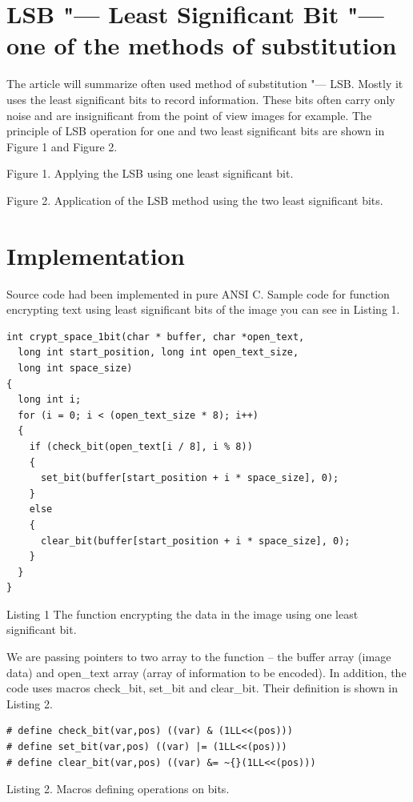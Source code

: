 \documentclass[10pt, a5paper]{article}
\begin{document}
\section{LSB "--- Least Significant Bit "--- one of the methods of substitution}

The article will summarize often used method of substitution "--- LSB. Mostly it uses the least significant bits to record information. These bits often carry only noise and are insignificant from the point of view images for example. The principle of LSB operation for one and two least significant bits are shown in Figure 1 and Figure 2.


Figure 1. Applying the LSB using one least significant bit.

Figure 2. Application of the LSB method using the two least significant bits.

\section{Implementation}

Source code had been implemented in pure ANSI C. Sample code for function encrypting text using least significant bits of the image you can see in Listing 1.

\begin{verbatim}
int crypt_space_1bit(char * buffer, char *open_text,
  long int start_position, long int open_text_size,
  long int space_size)
{
  long int i;
  for (i = 0; i < (open_text_size * 8); i++)
  {
    if (check_bit(open_text[i / 8], i % 8))
    {
      set_bit(buffer[start_position + i * space_size], 0);
    }
    else
    {
      clear_bit(buffer[start_position + i * space_size], 0);
    }
  }
}
\end{verbatim}

Listing 1 The function encrypting the data in the image using one least significant bit.

We are passing pointers to two array to the function -- the buffer array (image data) and open\_text array (array of information to be encoded). In addition, the code uses macros check\_bit, set\_bit and clear\_bit. Their definition is shown in Listing 2.

\begin{verbatim}
# define check_bit(var,pos) ((var) & (1LL<<(pos)))
# define set_bit(var,pos) ((var) |= (1LL<<(pos)))
# define clear_bit(var,pos) ((var) &= ~{}(1LL<<(pos)))
\end{verbatim}

Listing 2. Macros defining operations on bits.
\end{document}
